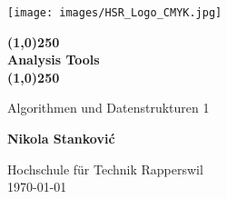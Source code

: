 \documentclass[a4paper,12pt]{scrartcl}
\newcommand{\documenttitel}{Analysis Tools}
\newcommand{\documentsubtitel}{Algorithmen und Datenstrukturen 1}
\newcommand{\documentauthors}{Nikola Stanković}
\begin{document}
\author{
  Stanković, Nikola
}


\begin{titlepage}
	\centering
	\texttt{[image: images/HSR\_Logo\_CMYK.jpg]}\par\vspace{1cm}
	\vspace{1cm}
	{\huge \bfseries \line(1,0){250} \\ \documenttitel \\ \line(1,0){250} \par}
	\vspace{0.5cm}	
	{\documentsubtitel \par}
	\vspace{1cm}
	{\Large \bfseries \documentauthors \par}

	\vfill

	{\large Hochschule für Technik Rapperswil \\ \today\par}
\end{titlepage}

\tableofcontents
\newpage







\newpage
\printglossaries
\end{document}
